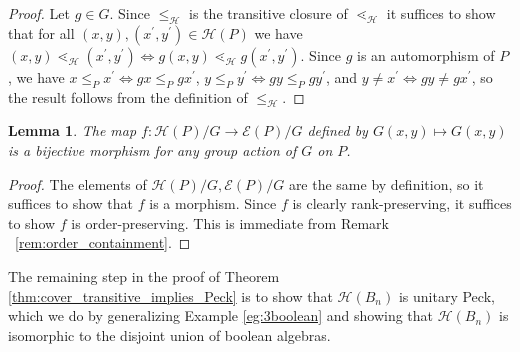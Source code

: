 \documentclass[10 pt]{amsart}
\theoremstyle{plain}
\newtheorem{lem}[thm]{Lemma}
\theoremstyle{definition}
\theoremstyle{remark}
\numberwithin{equation}{section}
\renewcommand{\iff}{\Leftrightarrow}
\begin{document}
\begin{proof}
Let $g\in G$.  Since $\le_{\mathcal{H}}$ is the transitive closure of $\lessdot_{\mathcal{H}}$ it suffices to show that for all $(x,y),(x^\prime,y^\prime)\in \mathcal{H}(P)$ we have $(x, y) \lessdot_{\mathcal H} (x^\prime,y^\prime) \iff g(x, y) \lessdot_{\mathcal H} g(x^\prime, y^\prime)$.  Since $g$ is an automorphism of $P$, we have $x\le_P x^\prime \iff gx\le_P gx^\prime$, $y\le_P y^\prime \iff gy\le_P gy^\prime$, and $y\neq x^\prime \iff gy\neq gx^\prime$, so the result follows from the definition of $\le_{\mathcal{H}}$.
\end{proof}







\begin{lem}
\label{lem:bijection_h_f}
The map $f:\mathcal H(P)/G \rightarrow \mathcal E(P)/G$ defined by $G(x,y) \mapsto G(x,y)$ is a bijective morphism for any group action of $G$ on $P$.
\end{lem}

\begin{proof}
The elements of $\mathcal H(P)/G,\mathcal E(P)/G$ are the same by definition, so it suffices to show that $f$ is a morphism. Since $f$ is clearly rank-preserving, it suffices to show $f$ is order-preserving. This is immediate from Remark ~\ref{rem:order_containment}.
\end{proof}

The remaining step in the proof of Theorem \ref{thm:cover_transitive_implies_Peck} is to show that $\mathcal{H}(B_n)$ is unitary Peck, which we do by generalizing Example \ref{eg:3boolean} and showing that $\mathcal{H}(B_n)$ is isomorphic to the disjoint union of boolean algebras.
\end{document}

